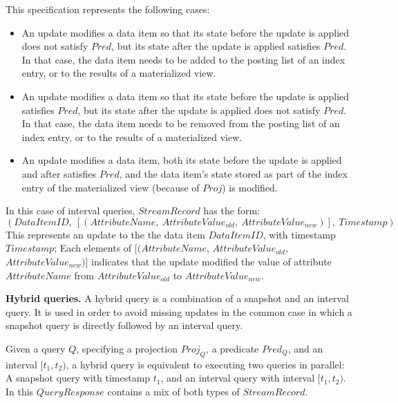 \noindent
This specification represents the following cases:
\begin{itemize}

\item An update modifies a data item so that its state before the update is applied does not satisfy $Pred$,
but its state after the update is applied satisfies $Pred$.
In that case, the data item needs to be added to the posting list of an index entry, or to the results of a
materialized view.

\item An update modifies a data item so that its state before the update is applied satisfies $Pred$,
but its state after the update is applied does not satisfy $Pred$.
In that case, the data item needs to be removed from the posting list of an index entry, or to the results of a
materialized view.

\item An update modifies a data item, both its state before the update is applied and after satisfies $Pred$,
and the data item's state stored as part of the index entry of the materialized view (because of $Proj$) is modified.

\end{itemize}

In this case of interval queries, $StreamRecord$ has the form:
\[
(DataItemID,~[(AttributeName,~AttributeValue_{old},~AttributeValue_{new})],~Timestamp)
\]
This represents an update to the the data item $DataItemID$, with timestamp $Timestamp$;
Each elements of $[(AttributeName$, $AttributeValue_{old}$, $AttributeValue_{new})]$ indicates that
the update modified the value of attribute $AttributeName$ from $AttributeValue_{old}$ to $AttributeValue_{new}$.

\medskip
\noindent
\textbf{Hybrid queries.}
A hybrid query is a combination of a snapshot and an interval query.
It is used in order to avoid missing updates in the common case in which a snapshot query is
directly followed by an interval query.

Given a query $Q$,
specifying a projection $Proj_Q$, a predicate $Pred_Q$, and an interval $[t_1, t_2)$,
a hybrid query is equivalent to executing two queries in parallel:
A snapshot query with timestamp $t_1$, and an interval query with interval $[t_1, t_2)$.
In this $QueryResponse$ contains a mix of both types of $StreamRecord$.


